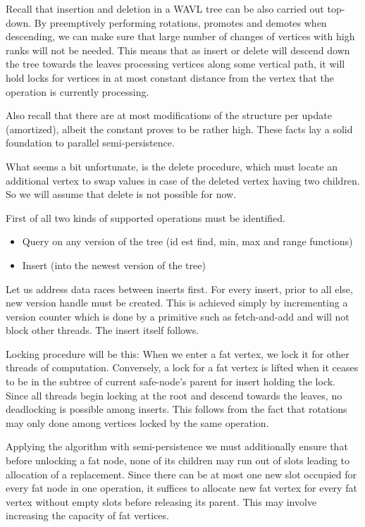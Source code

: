 Recall that insertion and deletion in a WAVL tree can be also carried out top-down.
By preemptively performing rotations, promotes and demotes when descending, we can make sure that large number of changes of vertices with high ranks will not be needed. This means that as insert or delete will descend down the tree towards the leaves processing vertices along some vertical path, it will hold locks for vertices in at most constant distance from the vertex that the operation is currently processing.

Also recall that there are at most  modifications of the structure per update (amortized), albeit the constant proves to be rather high. These facts lay a solid foundation to parallel semi-persistence.

What seems a bit unfortunate, is the delete procedure, which must locate an additional vertex to swap values in case of the deleted vertex having two children. So we will assume that delete is not possible for now.

First of all two kinds of supported operations must be identified. 

\begin{itemize}
	\item Query on any version of the tree (id est find, min, max and range functions)
	\item Insert (into the newest version of the tree)
\end{itemize}

Let us address data races between inserts first. For every insert, prior to all else, new version handle must be created. This is achieved simply by incrementing a version counter which is done by a primitive such as fetch-and-add and will not block other threads. The insert itself follows.

Locking procedure will be this: When we enter a fat vertex, we lock it for other threads of computation. Conversely, a lock for a fat vertex is lifted when it ceases to be in the subtree of current safe-node's parent for insert holding the lock. Since all threads begin locking at the root and descend towards the leaves, no deadlocking is possible among inserts. This follows from the fact that rotations may only done among vertices locked by the same operation.

Applying the algorithm with semi-persistence we must additionally ensure that before unlocking a fat node, none of its children may run out of slots leading to allocation of a replacement. Since there can be at most one new slot occupied for every fat node in one operation, it suffices to allocate new fat vertex for every fat vertex without empty slots before releasing its parent. This may involve increasing the capacity of fat vertices.

